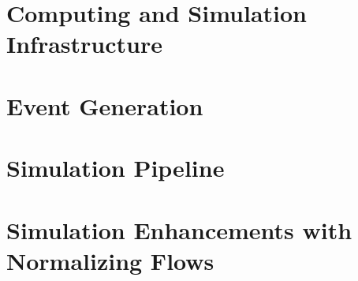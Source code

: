  \section{Computing and Simulation Infrastructure}\label{sec:ch3gemc}
    
    
\section{Event Generation}\label{sec:ch3generator}
    

\section{Simulation Pipeline}
    

\section{Simulation Enhancements with Normalizing Flows}
    



